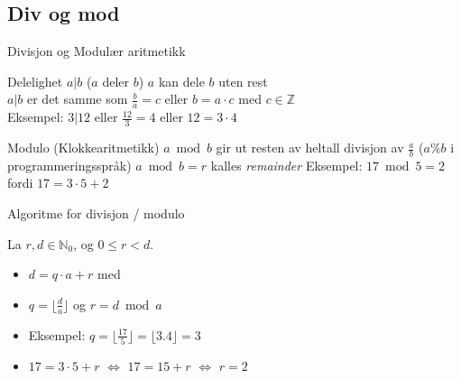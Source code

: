 \subsection{Div og mod}

\begin{frame}{Divisjon og Modulær aritmetikk}
    \begin{block}{Delelighet $a|b$ ($a$ deler $b$)}
        $a$ kan dele $b$ uten rest\\
        $a|b$ er det samme som $\frac{b}{a}=c$ eller $b=a\cdot c$ med $c \in \mathbb{Z}$\\
        Eksempel: $3|12$ eller $\frac{12}{3} = 4$ eller $12=3\cdot 4$
    \end{block}
    \pause
    \begin{block}{Modulo (Klokkearitmetikk)}
        $a \bmod b$ gir ut resten av heltall divisjon av $\frac{a}{b}$ ($a\%b$ i programmeringsspråk)
        $a \bmod b = r$ kalles \textit{remainder}
        Eksempel: $17 \bmod 5 = 2$ fordi $17 = 3 \cdot 5 + 2$ 
    \end{block}
\end{frame}

\begin{frame}[fragile]{Algoritme for divisjon / modulo}

    La $r, d \in \mathbb{N}_{0}$, og $0 \leq r < d$.
    \begin{itemize}[<+->]
        \item $d=q\cdot a + r$ med
        \item $q=\big\lfloor{\frac{d}{a}}\big\rfloor$ og $r=d \bmod a$
        \item Eksempel: $q=\big\lfloor{\frac{17}{5}}\big\rfloor = \lfloor{3.4}\rfloor=3$
        \item $17=3\cdot 5 + r$ $\iff$ $17=15+r$ $\iff$ $r=2$
    \end{itemize}

\end{frame}

